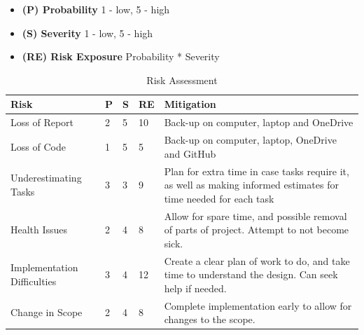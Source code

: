 \documentclass[12pt]{report}
\begin{document}
\begin{itemize}
    \item \textbf{(P) Probability} 1 - low, 5 - high
    \item \textbf{(S) Severity}  1 - low, 5 - high
    \item \textbf{(RE) Risk Exposure} Probability * Severity
\end{itemize}

\begin{table}[htbp]
    \renewcommand{\arraystretch}{1.3}
    \captionsetup{
        font=normalsize,
        skip=2pt %
    }
    \caption{Risk Assessment} %
    \centering %
    \begin{tabular}{|p{3cm} | p{0.4cm} | p{0.4cm} | p{0.6cm} | p{8cm}|} %
        \hline\hline %
        \textbf{Risk}               & \textbf{P} & \textbf{S} & \textbf{RE} & \textbf{Mitigation}                                                                                              \\ [0.5ex] %
        \hline %
        Loss of Report             & 2          & 5          & 10          & Back-up on computer, laptop and OneDrive                                                                         \\ \hline %
        Loss of Code                & 1          & 5          & 5           & Back-up on computer, laptop, OneDrive and GitHub                                                                 \\ \hline
        Underestimating Tasks       & 3          & 3          & 9           & Plan for extra time in case tasks require it, as well as making informed estimates for time needed for each task \\ \hline
        Health Issues               & 2          & 4          & 8           & Allow for spare time, and possible removal of parts of project. Attempt to not become sick.                      \\ \hline
        Implementation Difficulties & 3          & 4          & 12          & Create a clear plan of work to do, and take time to understand the design. Can seek help if needed.              \\ \hline
        Change in Scope             & 2          & 4          & 8           & Complete implementation early to allow for changes to the scope.
        \\ \hline %
    \end{tabular}
    \label{table:risk} %
\end{table}
\end{document}
